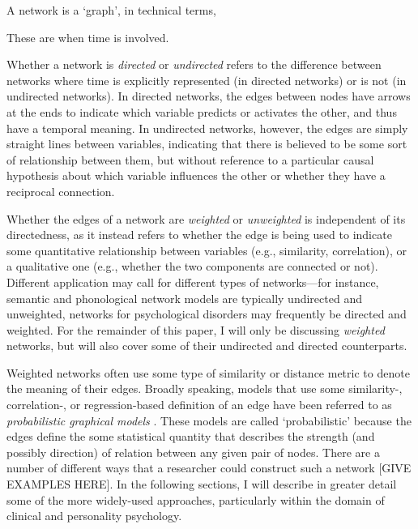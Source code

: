 A network is a `graph', in technical terms, 

These are when time is involved.

Whether a network is \textit{directed} or \textit{undirected} refers to the difference between networks where time is explicitly represented (in directed networks) or is not (in undirected networks). In directed networks, the edges between nodes have arrows at the ends to indicate which variable predicts or activates the other, and thus have a temporal meaning. In undirected networks, however, the edges are simply straight lines between variables, indicating that there is believed to be some sort of relationship between them, but without reference to a particular causal hypothesis about which variable influences the other or whether they have a reciprocal connection.

Whether the edges of a network are \textit{weighted} or \textit{unweighted} is independent of its directedness, as it instead refers to whether the edge is being used to indicate some quantitative relationship between variables (e.g., similarity, correlation), or a qualitative one (e.g., whether the two components are connected or not). Different application may call for different types of networks---for instance, semantic and phonological network models are typically undirected and unweighted, networks for psychological disorders may frequently be directed and weighted. For the remainder of this paper, I will only be discussing \textit{weighted} networks, but will also cover some of their undirected and directed counterparts.

Weighted networks often use some type of similarity or distance metric to denote the meaning of their edges. Broadly speaking, models that use some similarity-, correlation-, or regression-based definition of an edge have been referred to as \textit{probabilistic graphical models} \cite{lauritzen1996graphical}. These models are called `probabilistic' because the edges define the some statistical quantity that describes the strength (and possibly direction) of relation between any given pair of nodes. There are a number of different ways that a researcher could construct such a network [GIVE EXAMPLES HERE]. In the following sections, I will describe in greater detail some of the more widely-used approaches, particularly within the domain of clinical and personality psychology.